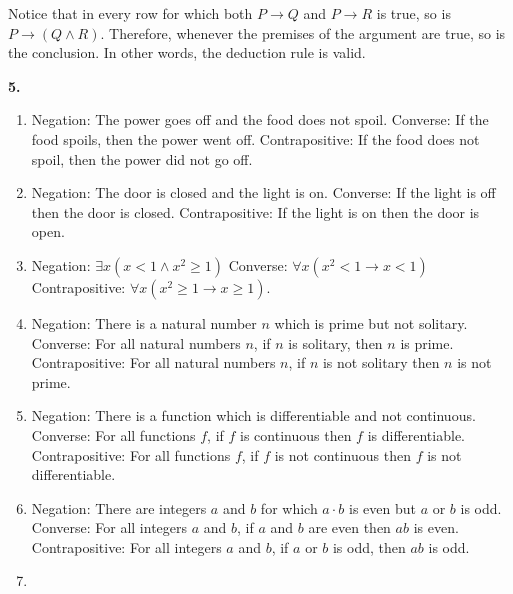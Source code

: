 \documentclass[10pt,]{book}
\theoremstyle{plain}
\theoremstyle{definition}
\theoremstyle{definition}
\theoremstyle{definition}
\numberwithin{equation}{chapter}
\def\imp{\rightarrow}
\newcommand{\lt}{ < }
\begin{document}
            Notice that in every row for which both \(P \imp Q\) and \(P \imp R\) is true, so is \(P \imp (Q \wedge R)\). Therefore, whenever the premises of the argument are true, so is the conclusion. In other words, the deduction rule is valid.
\par\smallskip
\noindent\textbf{5.}\quad{}\leavevmode%
\begin{enumerate}[label=(\alph*)]
\item\hypertarget{li-1128}{}
                Negation: The power goes off and the food does not spoil.
                Converse: If the food spoils, then the power went off.
                Contrapositive: If the food does not spoil, then the power did not go off.
\item\hypertarget{li-1129}{}
                Negation: The door is closed and the light is on.
                Converse: If the light is off then the door is closed.
                Contrapositive: If the light is on then the door is open.
\item\hypertarget{li-1130}{}
                Negation: \(\exists x (x \lt  1 \wedge x^2 \ge 1)\)
                Converse: \(\forall x( x^2 \lt  1 \imp x \lt  1)\)
                Contrapositive: \(\forall x (x^2 \ge 1 \imp x \ge 1)\).
\item\hypertarget{li-1131}{}
                Negation: There is a natural number \(n\) which is prime but not solitary.
                Converse: For all natural numbers \(n\), if \(n\) is solitary, then \(n\) is prime.
                Contrapositive: For all natural numbers \(n\), if \(n\) is not solitary then \(n\) is not prime.
\item\hypertarget{li-1132}{}
                Negation: There is a function which is differentiable and not continuous.
                Converse: For all functions \(f\), if \(f\) is continuous then \(f\) is differentiable.
                Contrapositive: For all functions \(f\), if \(f\) is not continuous then \(f\) is not differentiable.
\item\hypertarget{li-1133}{}
                Negation: There are integers \(a\) and \(b\) for which \(a\cdot b\) is even but \(a\) or \(b\) is odd.
                Converse: For all integers \(a\) and \(b\), if \(a\) and \(b\) are even then \(ab\) is even.
                Contrapositive: For all integers \(a\) and \(b\), if \(a\) or \(b\) is odd, then \(ab\) is odd.
\item\hypertarget{li-1134}{}

\end{enumerate}
\end{document}
